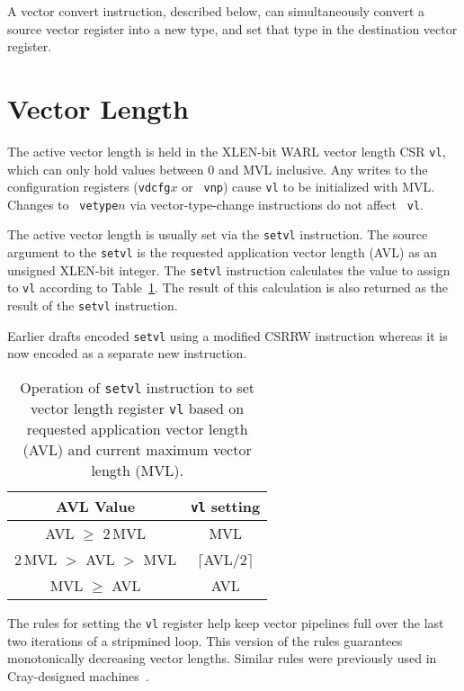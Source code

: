 A vector convert instruction, described below, can simultaneously
convert a source vector register into a new type, and set that type in
the destination vector register.

\section{Vector Length}

The active vector length is held in the XLEN-bit WARL vector length
CSR {\tt vl}, which can only hold values between 0 and MVL inclusive.
Any writes to the configuration registers ({\tt vdcfg}$x$ or {\tt
  vnp}) cause {\tt vl} to be initialized with MVL. Changes to {\tt
  vetype}$n$ via vector-type-change instructions do not affect {\tt
  vl}.

The active vector length is usually set via the {\tt setvl}
instruction.  The source argument to the {\tt setvl} is the requested
application vector length (AVL) as an unsigned XLEN-bit integer. The
{\tt setvl} instruction calculates the value to assign to {\tt vl}
according to Table~\ref{tab:vlcalc}.  The result of this calculation
is also returned as the result of the {\tt setvl} instruction.

\begin{commentary}
Earlier drafts encoded {\tt setvl} using a modified CSRRW instruction
whereas it is now encoded as a separate new instruction.
\end{commentary}

\begin{table}
  \centering
  \begin{tabular}{|c|c|}
    \hline
    AVL Value & {\tt vl} setting \\
    \hline
    AVL $\geq$ 2\,MVL & MVL \\
    2\,MVL $>$ AVL $>$ MVL & $\lceil$AVL$/2\rceil$ \\
    MVL $\geq$ AVL & AVL \\
    \hline
  \end{tabular}
  \caption{Operation of {\tt setvl} instruction to set vector
    length register {\tt vl} based on requested application vector
    length (AVL) and current maximum vector length (MVL).}
  \label{tab:vlcalc}
\end{table}

\begin{commentary}
  The rules for setting the {\tt vl} register help keep vector
  pipelines full over the last two iterations of a stripmined loop.
  This version of the rules guarantees monotonically decreasing vector
  lengths. 
  Similar rules were previously used in Cray-designed machines~\cite{crayx1asm}.
\end{commentary}

